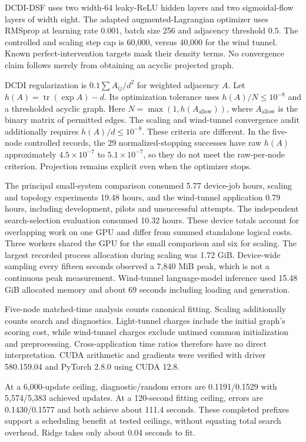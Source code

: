 \documentclass{svproc}
\begin{document}
DCDI-DSF uses two width-64 leaky-ReLU hidden layers and two sigmoidal-flow
layers of width eight. The adapted augmented-Lagrangian optimizer uses RMSprop
at learning rate $0.001$, batch size 256 and adjacency threshold $0.5$.
The controlled and scaling step cap is 60,000, versus 40,000 for the wind tunnel.
Known perfect-intervention targets mask their density terms. No convergence
claim follows merely from obtaining an acyclic projected graph.

DCDI regularization is $0.1\sum A_{ij}/d^2$ for weighted adjacency $A$.
Let $h(A)=\operatorname{tr}(\exp A)-d$. Its optimization tolerance uses
$h(A)/N\le10^{-8}$ and a thresholded acyclic graph. Here $N=\max(1,h(A_{\mathrm{allow}}))$,
where $A_{\mathrm{allow}}$ is the binary matrix of permitted edges. The scaling and wind-tunnel convergence audit additionally requires
$h(A)/d\le10^{-8}$. These criteria are different. In the five-node controlled
records, the 29 normalized-stopping successes have raw $h(A)$ approximately
$4.5\times10^{-7}$ to $5.1\times10^{-7}$, so they do not meet the raw-per-node
criterion. Projection remains explicit even when the optimizer stops.

The principal small-system comparison consumed 5.77 device-job hours, scaling
and topology experiments 19.48 hours, and the wind-tunnel application 0.79 hours,
including development, pilots and unsuccessful attempts. The independent
search-selection evaluation consumed 10.32 hours. These device totals account
for overlapping work on one GPU and differ from summed standalone logical costs.
Three workers shared the GPU for the small comparison and six for scaling.
The largest recorded process allocation during scaling was 1.72 GiB. Device-wide
sampling every fifteen seconds observed a 7,840 MiB peak, which is not a continuous
peak measurement. Wind-tunnel language-model inference used 15.48 GiB allocated
memory and about 69 seconds including loading and generation.

Five-node matched-time analysis counts canonical fitting. Scaling additionally
counts search and diagnostics. Light-tunnel charges include the initial graph's
scoring cost, while wind-tunnel charges exclude untimed common initialization
and preprocessing. Cross-application time ratios therefore have no direct
interpretation. CUDA arithmetic and gradients were verified with driver
580.159.04 and PyTorch 2.8.0 using CUDA 12.8.

At a 6,000-update ceiling, diagnostic/random errors are 0.1191/0.1529 with
5,574/5,383 achieved updates. At a 120-second fitting ceiling, errors are
0.1430/0.1577 and both achieve about 111.4 seconds. These completed prefixes
support a scheduling benefit at tested ceilings, without equating total search
overhead. Ridge takes only about 0.04 seconds to fit.
\end{document}

